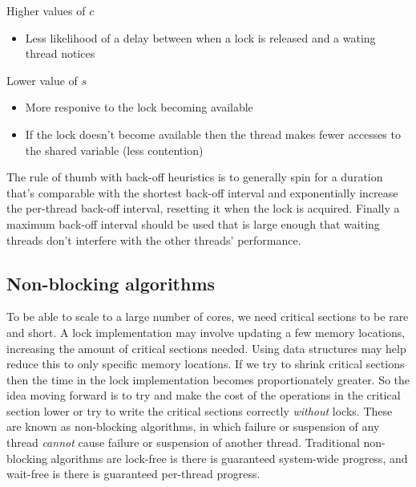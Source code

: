 \documentclass[CS4204-Notes.tex]{subfiles}
\begin{document}
\vspace{\baselineskip}
Higher values of $c$
\begin{itemize}
\item Less likelihood of a delay between when a lock is released and a wating thread notices
\end{itemize}
\vspace{\baselineskip}
Lower value of $s$
\begin{itemize}
\item More responive to the lock becoming available
\end{itemize}
\vspace{\baselineskip}
\begin{itemize}
\item If the lock doesn't become available then the thread makes fewer accesses to the shared variable (less contention)
\end{itemize}
The rule of thumb with back-off heuristics is to generally spin for a duration that's comparable with the shortest back-off interval and exponentially increase the per-thread back-off interval, resetting it when the lock is acquired. Finally a maximum back-off interval should be used that is large enough that waiting threads don't interfere with the other threads' performance.

\subsection{Non-blocking algorithms}
To be able to scale to a large number of cores, we need critical sections to be rare and short. A lock implementation may involve updating a few memory locations, increasing the amount of critical sections needed. Using data structures may help reduce this to only specific memory locations. If we try to shrink critical sections then the time in the lock implementation becomes proportionately greater. So the idea moving forward is to try and make the cost of the operations in the critical section lower or try to write the critical sections correctly \textit{without} locks.
\n
These are known as non-blocking algorithms, in which failure or suspension of any thread \textit{cannot} cause failure or suspension of another thread. Traditional non-blocking algorithms are lock-free is there is guaranteed system-wide progress, and wait-free is there is guaranteed per-thread progress.
\end{document}
